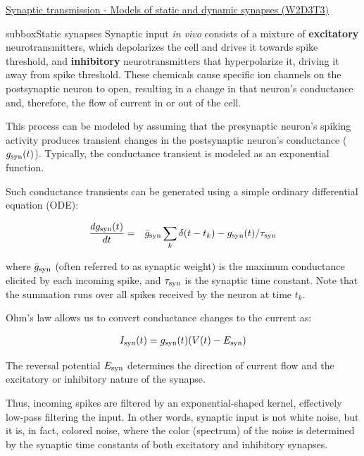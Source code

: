 \begin{textbox}{\href{https://compneuro.neuromatch.io/tutorials/W2D3_BiologicalNeuronModels/student/W2D3_Tutorial3.html}{Synaptic transmission - Models of static and dynamic synapses (W2D3T3)} }


\begin{subbox}{subbox}{Static synapses}
\scriptsize
Synaptic input \textit{in vivo} consists of a mixture of \textbf{excitatory} neurotransmitters, which depolarizes the cell and drives it towards spike threshold, and \textbf{inhibitory} neurotransmitters that hyperpolarize it, driving it away from spike threshold. These chemicals cause specific ion channels on the postsynaptic neuron to open, resulting in a change in that neuron's conductance and, therefore, the flow of current in or out of the cell.

This process can be modeled by assuming that the presynaptic neuron's spiking activity produces transient changes in the postsynaptic neuron's conductance ($g_{\rm syn}(t)$). Typically, the conductance transient is modeled as an exponential function. 

Such conductance transients can be generated using a simple ordinary differential equation (ODE):

\begin{eqnarray}
\frac{dg_{\rm syn}(t)}{dt} &=& \bar{g}_{\rm syn} \sum_k \delta(t-t_k) -g_{\rm syn}(t)/\tau_{\rm syn}
\end{eqnarray}

where $\bar{g}_{\rm syn}$ (often referred to as synaptic weight) is the maximum conductance elicited by each incoming spike, and $\tau_{\rm syn}$ is the synaptic time constant. Note that the summation runs over all spikes received by the neuron at time $t_k$.

Ohm's law allows us to convert conductance changes to the current as:

\begin{align}
I_{\rm syn}(t) = g_{\rm syn}(t)(V(t)-E_{\rm syn}) 
\end{align}

The reversal potential $E_{\rm syn}$ determines the direction of current flow and the excitatory or inhibitory nature of the synapse. 

Thus, incoming spikes are filtered by an exponential-shaped kernel, effectively low-pass filtering the input. In other words, synaptic input is not white noise, but it is, in fact, colored noise, where the color (spectrum) of the noise is determined by the synaptic time constants of both excitatory and inhibitory synapses.


\end{subbox}
\end{textbox}

